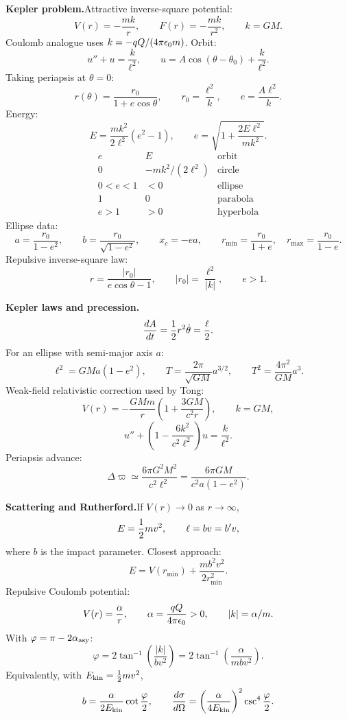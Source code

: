 \noindent\textbf{Kepler problem.}\quad Attractive inverse-square potential:
\[
  V(r)=-\frac{mk}{r},\qquad F(r)=-\frac{mk}{r^2},\qquad k=GM.
\]
Coulomb analogue uses $k=-qQ/(4\pi\epsilon_0 m)$. Orbit:
\[
  u''+u=\frac{k}{\ell^2},\qquad
  u=A\cos(\theta-\theta_0)+\frac{k}{\ell^2}.
\]
Taking periapsis at $\theta=0$:
\[
  \boxed{r(\theta)=\frac{r_0}{1+e\cos\theta}},\qquad
  r_0=\frac{\ell^2}{k},\qquad
  e=\frac{A\ell^2}{k}.
\]
Energy:
\[
  \boxed{E=\frac{mk^2}{2\ell^2}(e^2-1)},\qquad
  e=\sqrt{1+\frac{2E\ell^2}{mk^2}}.
\]
\[
\begin{array}{c|c|c}
e & E & \text{orbit}\\ \hline
0 & -mk^2/(2\ell^2) & \text{circle}\\
0<e<1 & <0 & \text{ellipse}\\
1 & 0 & \text{parabola}\\
e>1 & >0 & \text{hyperbola}
\end{array}
\]
Ellipse data:
\[
  a=\frac{r_0}{1-e^2},\qquad
  b=\frac{r_0}{\sqrt{1-e^2}},\qquad
  x_c=-ea,\qquad
  r_{\min}=\frac{r_0}{1+e},\quad r_{\max}=\frac{r_0}{1-e}.
\]
Repulsive inverse-square law:
\[
  r=\frac{|r_0|}{e\cos\theta-1},\qquad |r_0|=\frac{\ell^2}{|k|},\qquad e>1.
\]

\noindent\textbf{Kepler laws and precession.}\quad
\[
  \frac{dA}{dt}=\frac{1}{2} r^2\dot\theta=\frac{\ell}{2}.
\]
For an ellipse with semi-major axis $a$:
\[
  \ell^2=GMa(1-e^2),\qquad
  \boxed{T=\frac{2\pi}{\sqrt{GM}}a^{3/2}},\qquad
  \boxed{T^2=\frac{4\pi^2}{GM}a^3}.
\]
Weak-field relativistic correction used by Tong:
\[
  V(r)=-\frac{GMm}{r}\left(1+\frac{3GM}{c^2r}\right),\qquad k=GM,
\]
\[
  u''+\left(1-\frac{6k^2}{c^2\ell^2}\right)u=\frac{k}{\ell^2}.
\]
Periapsis advance:
\[
  \boxed{\Delta\varpi\simeq\frac{6\pi G^2M^2}{c^2\ell^2}
  =\frac{6\pi GM}{c^2a(1-e^2)}}.
\]

\noindent\textbf{Scattering and Rutherford.}\quad If $V(r)\to0$ as $r\to\infty$,
\[
  E=\frac{1}{2} mv^2,\qquad \ell=bv=b'v,
\]
where $b$ is the impact parameter. Closest approach:
\[
  E=V(r_{\min})+\frac{mb^2v^2}{2r_{\min}^2}.
\]
Repulsive Coulomb potential:
\[
  V(r)=\frac{\alpha}{r},\qquad \alpha=\frac{qQ}{4\pi\epsilon_0}>0,\qquad
  |k|=\alpha/m.
\]
With $\varphi=\pi-2\alpha_{\rm asy}$:
\[
  \boxed{\varphi=2\tan^{-1}\left(\frac{|k|}{bv^2}\right)
  =2\tan^{-1}\left(\frac{\alpha}{mbv^2}\right)}.
\]
Equivalently, with $E_{\rm kin}=\frac{1}{2} mv^2$,
\[
  b=\frac{\alpha}{2E_{\rm kin}}\cot\frac{\varphi}{2},\qquad
  \frac{d\sigma}{d\Omega}
  =\left(\frac{\alpha}{4E_{\rm kin}}\right)^2\csc^4\frac{\varphi}{2}.
\]

